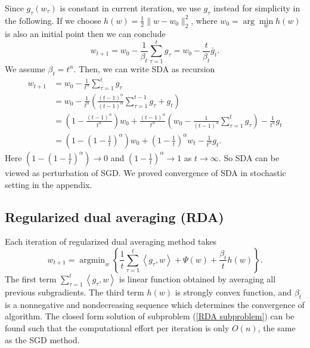 Since $g_\tau(w_\tau)$ is constant in current iteration, we use $g_\tau$ instead for simplicity in the following.
If we choose $h(w)=\frac{1}{2} \|w-w_0\|^2_2$, where $w_0=\arg \min\limits_w h(w)$ is also an initial point then we can conclude
\begin{equation}
	w_{t+1}=w_0 - \frac{1}{\beta_t} \sum_{\tau=1}^{t} g_\tau=w_0-\frac{t}{\beta_t} \bar g_t.
\end{equation}
We assume $\beta_t=t^\alpha$.
Then, we can write SDA as recursion
\begin{equation}\label{RDA}
	\begin{split}
		w_{t+1} & =w_0- \frac{1}{t^{\alpha}} \sum_{\tau=1}^{t} g_\tau\\
		& =w_0 -\frac{1}{t^{\alpha}} \left( \frac{(t-1)^{\alpha}}{(t-1)^{\alpha}} \sum_{\tau=1}^{t-1} g_\tau +g_t \right)\\
		& =\left( 1-\frac{(t-1)^{\alpha}}{t^{\alpha}} \right) w_0+ \frac{(t-1)^{\alpha}}{t^{\alpha}}\left( w_0 - \frac{1}{(t-1)^\alpha}\sum_{\tau=1}^{t} g_\tau \right) - \frac{1}{t^{\alpha}} g_t\\
		& =\left( 1-\left( 1-\frac{1}{t} \right)^{\alpha} \right) w_0 + \left( 1-\frac{1}{t} \right)^{\alpha} w_t -\frac{1}{t^{\alpha}} g_t .
	\end{split}
\end{equation}
Here $\left( 1-\left( 1-\frac{1}{t} \right)^{\alpha} \right) \rightarrow 0$ and $\left( 1-\frac{1}{t} \right)^{\alpha} \rightarrow 1$ as $t \rightarrow \infty$.
So SDA can be viewed as perturbation of SGD.
We proved convergence of SDA in stochastic setting in the appendix.

\subsection{Regularized dual averaging (RDA)}	
Each iteration of regularized dual averaging method takes 
\begin{equation}\label{RDA subproblem}
	w_{t+1}=\mathop{\arg\min}_w \left\{\frac{1}{t} \sum_{\tau=1}^{t} \left<g_{\tau},w\right>+\Psi(w)+\frac{\beta_t}{t}h(w)\right\}.
\end{equation}
The first term $\sum_{\tau=1}^{t} \left<g_{\tau},w\right>$ is linear function obtained by averaging all previous subgradients.
The third term $h(w)$ is strongly convex function, and $\beta_t$ is a nonnegative and nondecreasing sequence which determines the convergence of algorithm.
The closed form solution of subproblem (\ref{RDA subproblem}) can be found such that the computational effort per iteration is only $O(n)$, the same as the SGD method.

